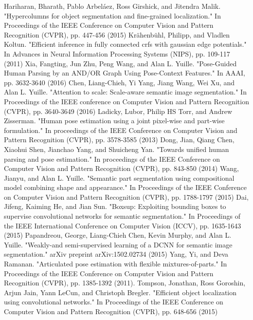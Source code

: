 \begin{thebibliography}{}
Hariharan, Bharath, Pablo Arbeláez, Ross Girshick, and Jitendra Malik. "Hypercolumns for object segmentation and fine-grained localization." In Proceedings of the IEEE Conference on Computer Vision and Pattern Recognition (CVPR), pp. 447-456 (2015)
Krähenbühl, Philipp, and Vladlen Koltun. "Efficient inference in fully connected crfs with gaussian edge potentials." In Advances in Neural Information Processing Systems (NIPS), pp. 109-117 (2011)
Xia, Fangting, Jun Zhu, Peng Wang, and Alan L. Yuille. "Pose-Guided Human Parsing by an AND/OR Graph Using Pose-Context Features." In AAAI, pp. 3632-3640 (2016)
Chen, Liang-Chieh, Yi Yang, Jiang Wang, Wei Xu, and Alan L. Yuille. "Attention to scale: Scale-aware semantic image segmentation." In Proceedings of the IEEE conference on Computer Vision and Pattern Recognition (CVPR), pp. 3640-3649 (2016)
Ladicky, Lubor, Philip HS Torr, and Andrew Zisserman. "Human pose estimation using a joint pixel-wise and part-wise formulation." In proceedings of the IEEE Conference on Computer Vision and Pattern Recognition (CVPR), pp. 3578-3585 (2013)
Dong, Jian, Qiang Chen, Xiaohui Shen, Jianchao Yang, and Shuicheng Yan. "Towards unified human parsing and pose estimation." In proceedings of the IEEE Conference on Computer Vision and Pattern Recognition (CVPR), pp. 843-850 (2014)
Wang, Jianyu, and Alan L. Yuille. "Semantic part segmentation using compositional model combining shape and appearance." In Proceedings of the IEEE Conference on Computer Vision and Pattern Recognition (CVPR), pp. 1788-1797 (2015)
%
Dai, Jifeng, Kaiming He, and Jian Sun. "Boxsup: Exploiting bounding boxes to supervise convolutional networks for semantic segmentation." In Proceedings of the IEEE International Conference on Computer Vision (ICCV), pp. 1635-1643 (2015)
Papandreou, George, Liang-Chieh Chen, Kevin Murphy, and Alan L. Yuille. "Weakly-and semi-supervised learning of a DCNN for semantic image segmentation." arXiv preprint arXiv:1502.02734 (2015)
%
Yang, Yi, and Deva Ramanan. "Articulated pose estimation with flexible mixtures-of-parts." In Proceedings of the IEEE Conference on Computer Vision and Pattern Recognition (CVPR), pp. 1385-1392 (2011).
Tompson, Jonathan, Ross Goroshin, Arjun Jain, Yann LeCun, and Christoph Bregler. "Efficient object localization using convolutional networks." In Proceedings of the IEEE Conference on Computer Vision and Pattern Recognition (CVPR), pp. 648-656 (2015)

\end{thebibliography}
